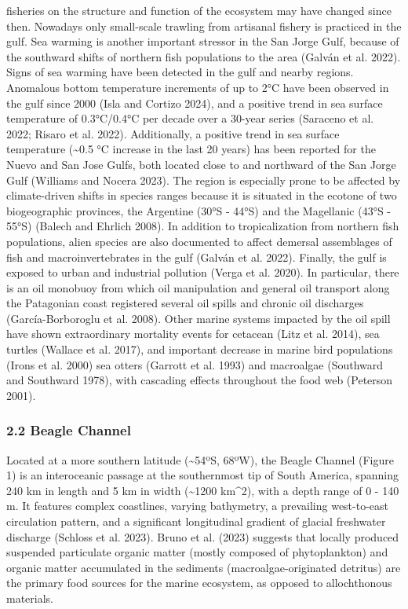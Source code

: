\documentclass[
]{article}
\begin{document}
fisheries on the structure and function of the ecosystem may have
changed since then. Nowadays only small-scale trawling from artisanal
fishery is practiced in the gulf. Sea warming is another important
stressor in the San Jorge Gulf, because of the southward shifts of
northern fish populations to the area (Galván et al. 2022). Signs of sea
warming have been detected in the gulf and nearby regions. Anomalous
bottom temperature increments of up to 2°C have been observed in the
gulf since 2000 (Isla and Cortizo 2024), and a positive trend in sea
surface temperature of 0.3°C/0.4°C per decade over a 30-year series
(Saraceno et al. 2022; Risaro et al. 2022). Additionally, a positive
trend in sea surface temperature (\textasciitilde0.5 °C increase in the
last 20 years) has been reported for the Nuevo and San Jose Gulfs, both
located close to and northward of the San Jorge Gulf (Williams and
Nocera 2023). The region is especially prone to be affected by
climate-driven shifts in species ranges because it is situated in the
ecotone of two biogeographic provinces, the Argentine (30°S - 44°S) and
the Magellanic (43°S - 55°S) (Balech and Ehrlich 2008). In addition to
tropicalization from northern fish populations, alien species are also
documented to affect demersal assemblages of fish and macroinvertebrates
in the gulf (Galván et al. 2022). Finally, the gulf is exposed to urban
and industrial pollution (Verga et al. 2020). In particular, there is an
oil monobuoy from which oil manipulation and general oil transport along
the Patagonian coast registered several oil spills and chronic oil
discharges (García-Borboroglu et al. 2008). Other marine systems
impacted by the oil spill have shown extraordinary mortality events for
cetacean (Litz et al. 2014), sea turtles (Wallace et al. 2017), and
important decrease in marine bird populations (Irons et al. 2000) sea
otters (Garrott et al. 1993) and macroalgae (Southward and Southward
1978), with cascading effects throughout the food web (Peterson 2001).

\subsubsection{2.2 Beagle Channel}\label{beagle-channel}

Located at a more southern latitude (\textasciitilde54ºS, 68ºW), the
Beagle Channel (Figure 1) is an interoceanic passage at the southernmost
tip of South America, spanning 240 km in length and 5 km in width
(\textasciitilde1200 km\^{}2), with a depth range of 0 - 140 m. It
features complex coastlines, varying bathymetry, a prevailing
west-to-east circulation pattern, and a significant longitudinal
gradient of glacial freshwater discharge (Schloss et al. 2023). Bruno et
al. (2023) suggests that locally produced suspended particulate organic
matter (mostly composed of phytoplankton) and organic matter accumulated
in the sediments (macroalgae-originated detritus) are the primary food
sources for the marine ecosystem, as opposed to allochthonous materials.
\end{document}
